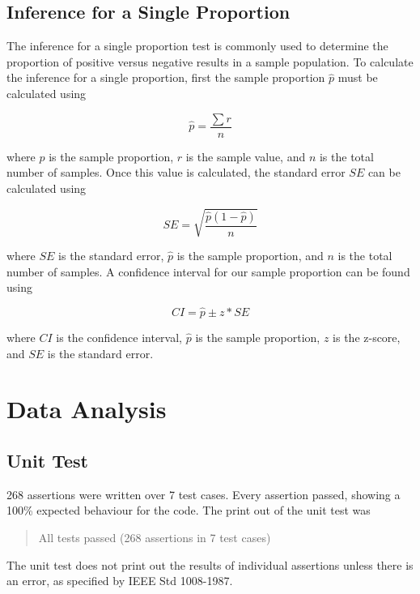 \documentclass[12pt]{article}
\begin{document}
\subsection{Inference for a Single Proportion}
The inference for a single proportion test is commonly used to determine the proportion of positive versus negative results in a sample population. To calculate the inference for a single proportion, first the sample proportion $\hat{p}$ must be calculated using

\begin{equation}
    \hat{p} = \frac{\sum{r}}{n}
    \label{eq:sample-proportion}
\end{equation}

where $\hat{p}$ is the sample proportion, $r$ is the sample value, and $n$ is the total number of samples. Once this value is calculated, the standard error $SE$ can be calculated using

\begin{equation}
    SE = \sqrt{\frac{\hat{p}(1 - \hat{p})}{n}}
    \label{eq:standard-error}
\end{equation}

where $SE$ is the standard error, $\hat{p}$ is the sample proportion, and $n$ is the total number of samples. A confidence interval for our sample proportion can be found using

\begin{equation}
    CI = \hat{p} \pm z*SE
    \label{eq:confidence-interval}
\end{equation}

where $CI$ is the confidence interval, $\hat{p}$ is the sample proportion, $z$ is the z-score, and $SE$ is the standard error.

\section{Data Analysis}
\subsection{Unit Test}
268 assertions were written over 7 test cases. Every assertion passed, showing a 100\% expected behaviour for the code. The print out of the unit test was

\begin{quote}
    All tests passed (268 assertions in 7 test cases)
\end{quote}

The unit test does not print out the results of individual assertions unless there is an error, as specified by IEEE Std 1008-1987.
\end{document}
